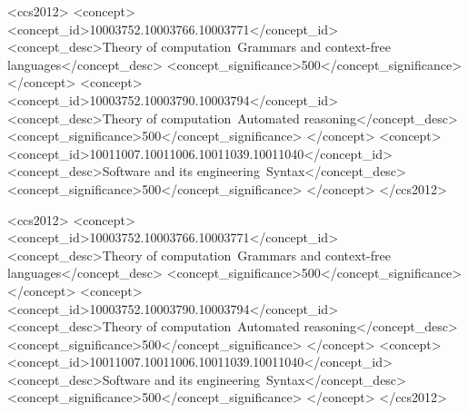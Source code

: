 \documentclass[sigplan,10pt,anonymous,review]{acmart}\settopmatter{printfolios=true,printccs=false,printacmref=false}
\begin{document}

\begin{CCSXML}
<ccs2012>
<concept>
<concept_id>10003752.10003766.10003771</concept_id>
<concept_desc>Theory of computation~Grammars and context-free languages</concept_desc>
<concept_significance>500</concept_significance>
</concept>
<concept>
<concept_id>10003752.10003790.10003794</concept_id>
<concept_desc>Theory of computation~Automated reasoning</concept_desc>
<concept_significance>500</concept_significance>
</concept>
<concept>
<concept_id>10011007.10011006.10011039.10011040</concept_id>
<concept_desc>Software and its engineering~Syntax</concept_desc>
<concept_significance>500</concept_significance>
</concept>
</ccs2012>

\begin{CCSXML}
<ccs2012>
<concept>
<concept_id>10003752.10003766.10003771</concept_id>
<concept_desc>Theory of computation~Grammars and context-free languages</concept_desc>
<concept_significance>500</concept_significance>
</concept>
<concept>
<concept_id>10003752.10003790.10003794</concept_id>
<concept_desc>Theory of computation~Automated reasoning</concept_desc>
<concept_significance>500</concept_significance>
</concept>
<concept>
<concept_id>10011007.10011006.10011039.10011040</concept_id>
<concept_desc>Software and its engineering~Syntax</concept_desc>
<concept_significance>500</concept_significance>
</concept>
</ccs2012>
\end{CCSXML}




\maketitle



\end{CCSXML}
\end{document}
